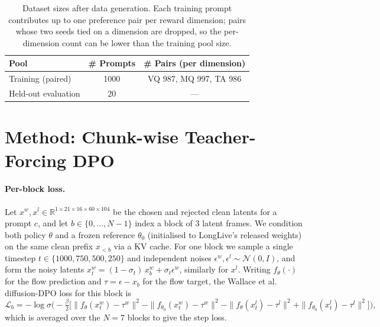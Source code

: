 \documentclass{article}
\begin{document}
\begin{table}[t]
\centering
\caption{Dataset sizes after data generation. Each training prompt contributes up to one preference pair per reward dimension; pairs whose two seeds tied on a dimension are dropped, so the per-dimension count can be lower than the training pool size.}
\label{tab:data}
\begin{tabular}{lcc}
\toprule
Pool & \# Prompts & \# Pairs (per dimension) \\
\midrule
Training (paired)    & 1000 & VQ 987, MQ 997, TA 986 \\
Held-out evaluation  & 20  & --- \\
\bottomrule
\end{tabular}
\end{table}

\section{Method: Chunk-wise Teacher-Forcing DPO}
\label{sec:method}

\paragraph{Per-block loss.} Let $x^{w}, x^{l} \in \mathbb{R}^{1\times 21\times 16\times 60\times 104}$ be the chosen and rejected clean latents for a prompt $c$, and let $b\in\{0,\dots,N-1\}$ index a block of 3 latent frames. We condition both policy $\theta$ and a frozen reference $\theta_0$ (initialised to LongLive's released weights) on the same clean prefix $x_{<b}$ via a KV cache. For one block we sample a single timestep $t\in\{1000,750,500,250\}$ and independent noises $\epsilon^{w}, \epsilon^{l} \sim \mathcal{N}(0, I)$, and form the noisy latents $x^{w}_t = (1-\sigma_t)\,x^{w}_b + \sigma_t \epsilon^{w}$, similarly for $x^{l}$. Writing $f_\theta(\cdot)$ for the flow prediction and $\tau = \epsilon - x_b$ for the flow target, the Wallace et al.~\cite{wallace2023diffusiondpo} diffusion-DPO loss for this block is
\begin{equation}
\label{eq:dpo}
\mathcal{L}_b = -\log \sigma\!\Big(-\tfrac{\beta}{2}\big[\|f_\theta(x^{w}_t)-\tau^w\|^2 - \|f_{\theta_0}(x^{w}_t)-\tau^w\|^2 - \|f_\theta(x^{l}_t)-\tau^l\|^2 + \|f_{\theta_0}(x^{l}_t)-\tau^l\|^2\big]\Big),
\end{equation}
which is averaged over the $N=7$ blocks to give the step loss.
\end{document}

